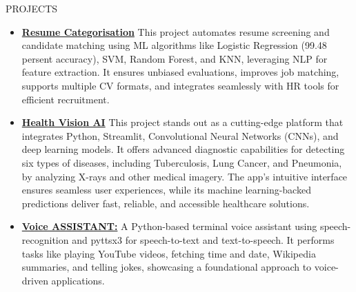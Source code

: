 \documentclass{resume}
\begin{document}
\begin{rSection}{PROJECTS}
    \begin{itemize}
        \item \textbf{\href{https://github.com}{Resume Categorisation}} {This project automates resume screening and candidate matching using ML algorithms like Logistic Regression (99.48 persent accuracy), SVM, Random Forest, and KNN, leveraging NLP for feature extraction. It ensures unbiased evaluations, improves job matching, supports multiple CV formats, and integrates seamlessly with HR tools for efficient recruitment.}
        \vspace{-0.2em}
        \item \textbf{\href{https://github.com}{Health Vision AI}} {This project stands out as a cutting-edge platform that integrates Python, Streamlit, Convolutional Neural Networks (CNNs), and deep learning models. It offers advanced diagnostic capabilities for detecting six types of diseases, including Tuberculosis, Lung Cancer, and Pneumonia, by analyzing X-rays and other medical imagery. The app's intuitive interface ensures seamless user experiences, while its machine learning-backed predictions deliver fast, reliable, and accessible healthcare solutions.}
        \vspace{-0.2em}
        \item \textbf{\href{https://github.com/trishaamandal/VoiceAssistent}{Voice ASSISTANT:}} {A Python-based terminal voice assistant using speech-recognition and pyttsx3 for speech-to-text and text-to-speech. It performs tasks like playing YouTube videos, fetching time and date, Wikipedia summaries, and telling jokes, showcasing a foundational approach to voice-driven applications.}
        \vspace{-0.2em}
    \end{itemize}
\end{rSection}
\vspace{-0.4em}
\end{document}
